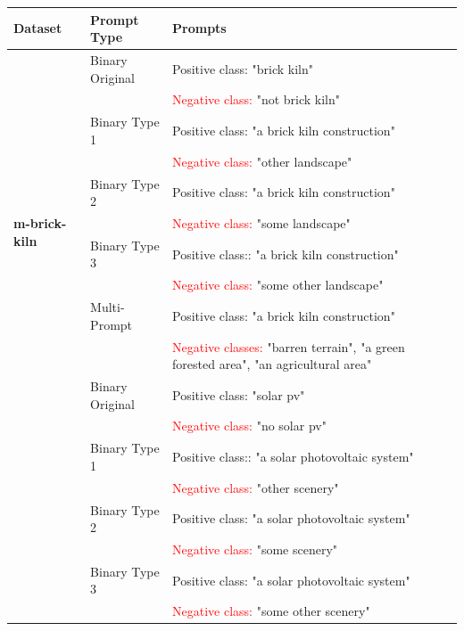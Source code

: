 \documentclass[a4paper, oneside, english]{sapthesis} %
\begin{document}
\begin{table}[H]
\centering
\footnotesize
\renewcommand{\arraystretch}{1.2}
\begin{tabular}{llp{8cm}}
\toprule
\textbf{Dataset} & \textbf{Prompt Type} & \textbf{Prompts} \\
\midrule
\multirow{11}{*}{\textbf{m-brick-kiln}} 
  & Binary Original & \textcolor{customgreen}{Positive class:} "brick kiln" \\
  & & \textcolor{red}{Negative class:} "not brick kiln" \\
  \cmidrule(lr){2-3}
  & Binary Type 1 & \textcolor{customgreen}{Positive class:} "a brick kiln construction" \\
  & & \textcolor{red}{Negative class:} "other landscape" \\
  \cmidrule(lr){2-3}
  & Binary Type 2 & \textcolor{customgreen}{Positive class:} "a brick kiln construction" \\
  & & \textcolor{red}{Negative class:} "some landscape" \\
  \cmidrule(lr){2-3}
  & Binary Type 3 & \textcolor{customgreen}{Positive class:}: "a brick kiln construction" \\
  & & \textcolor{red}{Negative class:} "some other landscape" \\
  \cmidrule(lr){2-3}
  & Multi-Prompt & \textcolor{customgreen}{Positive class:} "a brick kiln construction" \\
  & & \textcolor{red}{Negative classes:} "barren terrain", "a green forested area", "an agricultural area" \\
\midrule
\multirow{11}{*}{\textbf{m-pv4ger}} 
  & Binary Original & \textcolor{customgreen}{Positive class:} "solar pv" \\
  & & \textcolor{red}{Negative class:} "no solar pv" \\
  \cmidrule(lr){2-3}
  & Binary Type 1 & \textcolor{customgreen}{Positive class:}: "a solar photovoltaic system" \\
  & & \textcolor{red}{Negative class:} "other scenery" \\
  \cmidrule(lr){2-3}
  & Binary Type 2 & \textcolor{customgreen}{Positive class:} "a solar photovoltaic system" \\
  & & \textcolor{red}{Negative class:} "some scenery" \\
  \cmidrule(lr){2-3}
  & Binary Type 3 & \textcolor{customgreen}{Positive class:} "a solar photovoltaic system" \\
  & & \textcolor{red}{Negative class:} "some other scenery" \\

\end{tabular}
\end{table}
\end{document}
